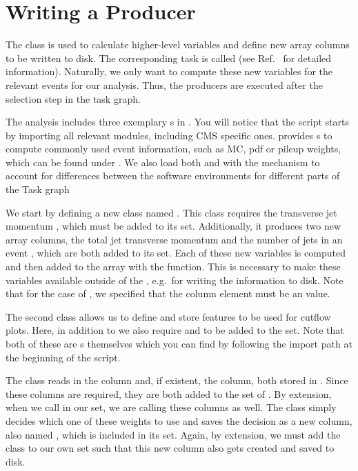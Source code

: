 \section{Writing a Producer}\label{sec:producer}

The  class is used to calculate higher-level variables and define new array columns to be written to disk.
The corresponding task is called  (see Ref.~\cite{cf_repo} for detailed information).
Naturally, we only want to compute these new variables for the relevant events for our analysis.
Thus, the producers are executed after the selection step in the task graph. 

The  analysis includes three exemplary s in .
You will notice that the script starts by importing all relevant modules, including CMS specific ones.
\columnflow provides s to compute commonly used event information, such as MC, pdf or pileup weights, which can be found under .
We also load both  and  with the  mechanism to account for differences between the software environments for different parts of the Task graph

We start by defining a new  class named .
This class requires the transverse jet momentum , which must be added to its  set.
Additionally, it produces two new array columns, the total jet transverse momentum  and the number of jets in an event , which are both added to its  set.
Each of these new variables is computed and then added to the  array with the  function.
This is necessary to make these variables available outside of the , e.g.\ for writing the information to disk.
Note that for the case of , we specified that the column element must be an  value.

The second  class  allows us to define and store features to be used for cutflow plots. Here, in addition to  we also require  and  to be added to the  set. Note that both of these are s themselves which you can find by following the import path at the beginning of the script. 

The   class  reads in the  column and, if existent, the  column, both stored in . Since these columns are required, they are both added to the  set of . By extension, when we call  in our  set, we are calling these columns as well. The  class simply decides which one of these weights to use and saves the decision as a new column, also named , which is included in its  set. Again, by extension, we must add the  class to our own  set such that this new column also gets created and saved to disk. 

